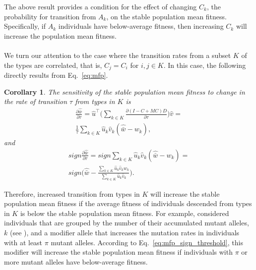 \documentclass[9pt, a4paper, twocolumn]{extarticle}
\newcommand*{\tr}{^\intercal}
\newtheorem{corollary}{Corollary}
\begin{document}
The above result provides a condition for the effect of changing $C_k$, the probability for transition from $A_k$, on the stable population mean fitness.
Specifically, if $A_k$ individuals have below-average fitness, then increasing $C_k$ will increase the population mean fitness.

\paragraph*{}
We turn our attention to the case where the transition rates from a subset $K$ of the types are correlated, that is, $C_j=C_i$ for $i,j \in K$.
In this case, the following directly results from Eq.~\ref{eq:mfp}.

\begin{corollary}
The sensitivity of the stable population mean fitness to change in the rate of transition $\tau$ from types in $K$ is
\begin{equation}\label{eq:mfp_K}
\begin{aligned}
\frac{\partial \hat{\bar w}}{\partial \tau} = 
\hat u\tr \Big( \sum_{k \in K}{\frac{\partial (I - C + MC)D}{\partial \tau}} \Big) \hat v = \\
\frac{1}{\tau} \sum_{k \in K}{\hat u_k \hat v_k (\hat{\bar w} - w_k)},
\end{aligned}
\end{equation}
and
\begin{multline}\label{eq:mfp_sign_threshold}
sign \frac{\partial \hat{\bar w}}{\partial \tau} = 
sign \sum_{k \in K}{\hat u_k \hat v_k (\hat{\bar w} - w_k)} = \\ 
sign \Big(\hat{\bar w} - \frac{\sum_{k \in K}{\hat u_k \hat v_k w_k}}{\sum_{k \in K}{\hat u_k \hat v_k}}\Big).
\end{multline}
\end{corollary}

Therefore, increased transition from types in $K$ will increase the stable population mean fitness if the average fitness of individuals descended from types in $K$ is below the stable population mean fitness.
For example, \citet[Appendix~B]{Ram2012} considered individuals that are grouped by the number of their accumulated mutant alleles, $k$ (see ), 
and a modifier allele that increases the mutation rates in individuals with at least $\pi$ mutant alleles.
According to Eq.~\ref{eq:mfp_sign_threshold}, this modifier will increase the stable population mean fitness if individuals with $\pi$ or more mutant alleles have below-average fitness. 
\end{document}
